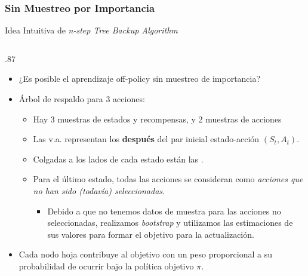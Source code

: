 \documentclass[10pt, envcountsect, handout, aspectratio=1610, hyperref={hypertexnames=true}]{beamer}
\begin{document}

\subsubsection{Sin Muestreo por Importancia}




\begin{frame}{Idea Intuitiva de \textit{n-step Tree Backup Algorithm}}
	\begin{columns}
		\begin{column}{.87\textwidth}
			\begin{itemize}
				\item ¿Es posible el aprendizaje off-policy sin muestreo de importancia?
				\item Árbol de respaldo para 3 acciones:
				\begin{itemize}
					\item Hay 3 muestras de estados y recompensas, y 2 muestras de acciones
					\item  Las v.a. representan los  \textbf{después} del par inicial estado-acción \( (S_t, A_t) \).
					\item Colgadas a los lados de cada estado están las . 
					\item Para el último estado, todas las acciones se consideran como \textit{acciones que no han sido (todavía) seleccionadas}.
					\begin{itemize}
						\item Debido a que no tenemos datos de muestra para las acciones no seleccionadas, realizamos \textit{bootstrap} y utilizamos las estimaciones de sus valores para formar el objetivo para la actualización.
					\end{itemize}
				\end{itemize}
				
				\item  Cada nodo hoja contribuye al objetivo con un peso proporcional a su probabilidad de ocurrir bajo la política objetivo \( \pi \).
				\begin{itemize}
					

\end{itemize}
\end{itemize}
\end{column}
\end{columns}
\end{frame}
\end{document}
